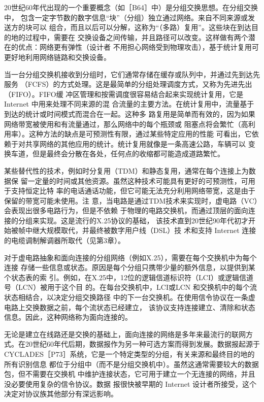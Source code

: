 20世纪60年代出现的一个重要概念（如［B64］中）是分组交换思想。在分组交换中，
包含一定字节数的数字信息“块”（分组）独立通过网络。来自不同来源或发送方的块可以
组合，而且以后可以分解，这称为“（多路）复用”。这些块在到达目的地的过程中，需要在
交换设备之间传输，并且路径可以改变。这样做有两个潜在的优点：网络更有弹性（设计者
不用担心网络受到物理攻击），基于统计复用可更好地利用网络链路和交换设备。

当一台分组交换机接收到分组时，它们通常存储在缓存或队列中，并通过先到达先服务
（FCFS）的方式处理。这是最简单的分组处理调度方式，又称为先进先出（FIFO）。FIFO缓
冲区管理和按需调度很容易结合起来实现统计复用，它是 Internet 中用来处理不同来源的混
合流量的主要方法。在统计复用中，流量基于到达的统计或时间模式而混合在一起。这种多
路复用是简单而有效的，因为如果网络带宽被使用和有流量通过，那么网络中的每个瓶颈或
阻塞点将会繁忙（高利用率）。这种方法的缺点是可预测性有限，通过某些特定应用的性能
可看出，它依赖于对共享网络的其他应用的统计。统计复用就像是一条高速公路，车辆可以
变换车道，但是最终会分散在各处，任何点的收缩都可能造成道路繁忙。

某些替代性的技术，例如时分复用（TDM）和静态复用，通常在每个连接上为数据保
留一定量的时间或其他资源。虽然这种技术可能具有更好的可预测性，可用于支持恒定比特
率的电话通话功能，但它可能无法充分利用网络带宽，这是由于保留的带宽可能未使用。注
意，当电路是通过TDM技术来实现时，虚电路（VC）会表现出很多电路行为，但是不依赖
于物理的电路交换机，而通过顶层的面向连接的分组来实现。这是流行的X.25协议的基础，
该技术直到20世纪90年代初才开始被帧中继大规模取代，并最终被数字用户线（DSL）技
术和支持 Internet 连接的电缆调制解调器所取代（见第3章）。

对于虚电路抽象和面向连接的分组网络（例如X.25），需要在每个交换机中为每个连接
存储一些信息或状态。原因是每个分组只携带少量的额外信息，以提供到某个状态表的索
引。例如，在X.25中，12位的逻辑信道标识符（LCI）或逻辑信道号（LCN）被用于这个目
的。在每台交换机中，LCI或LCN 和交换机中的每个流状态相结合，以决定分组交换路径
中的下一台交换机。在使用信令协议在一条虚电路上交换数据之前，每个流状态已经建立，
该协议支持连接建立、清除和状态信息。因此，这种网络称为面向连接的。

无论是建立在线路还是交换的基础上，面向连接的网络是多年来最流行的联网方
式。在20世纪60年代后期，数据报作为另一种可选方案而得到发展。数据报起源于
CYCLADES［P73］系统，它是一个特定类型的分组，有关来源和最终目的地的所有识别信息
都位于分组中（而不是分组交换机中）。虽然这通常需要较大的数据包，但不需要在交换机
中维护连接状态，它可用于建立一个无连接的网络，并且没必要使用复杂的信令协议。数据
报很快被早期的 Internet 设计者所接受，这个决定对协议族其他部分有深远影响。

